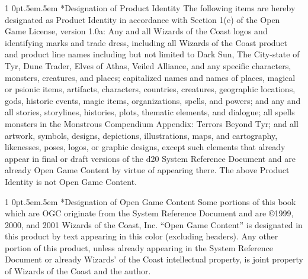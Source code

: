 \documentclass[onecolumn,oneside]{d20}
\makeatletter
\renewcommand\section{
  \@startsection{section}
  {1}
  {0pt}{.5em}{.5em}{\color{ChapterColor}\Large\scshape\raggedleft\imfellEnglish}
}
\makeatother
\begin{document}
\section*{Designation of Product Identity}
The following items are hereby designated as Product Identity in accordance with Section 1(e) of the Open Game License, version 1.0a: Any and all Wizards of the Coast logos and identifying marks and trade dress, including all Wizards of the Coast product and product line names including but not limited to Dark Sun, The City-state of Tyr, Dune Trader, Elves of Athas, Veiled Alliance, and any specific characters, monsters, creatures, and places; capitalized names and names of places, magical or psionic items, artifacts, characters, countries, creatures, geographic locations, gods, historic events, magic items, organizations, spells, and powers; and any and all stories, storylines, histories, plots, thematic elements, and dialogue; all spells monsters in the Monstrous Compendium Appendix: Terrors Beyond Tyr; and all artwork, symbols, designs, depictions, illustrations, maps, and cartography, likenesses, poses, logos, or graphic designs, except such elements that already appear in final or draft versions of the d20 System Reference Document and are already Open Game Content by virtue of appearing there. The above Product Identity is not Open Game Content.

\section*{Designation of Open Game Content}
Some portions of this book which are OGC originate from the System Reference Document and are ©1999, 2000, and 2001 Wizards of the Coast, Inc. ``Open Game Content'' is designated in this product by text appearing in this color (excluding headers). Any other portion of this product, unless already appearing in the System Reference Document or already Wizards' of the Coast intellectual property, is joint property of Wizards of the Coast and the author.
\end{document}

